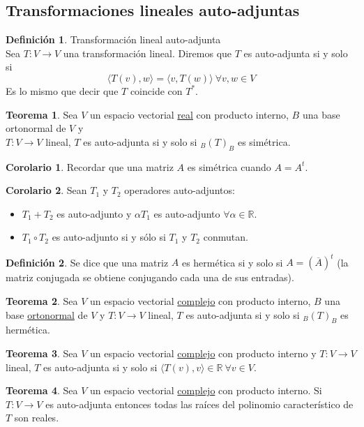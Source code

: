 \documentclass[10pt]{article}
\theoremstyle{definition}
\newtheorem{definition}{Definición}[section]
\newtheorem{theorem}{Teorema}[section]
\newtheorem{corollary}{Corolario}[theorem]
\begin{document}
\subsection{Transformaciones lineales auto-adjuntas}
\begin{definition}{Transformación lineal auto-adjunta}
	\\Sea $T:V\to V$ una transformación lineal. Diremos que $T$ es auto-adjunta si y solo si $$\langle T(v),w\rangle=\langle v,T(w)\rangle\ \forall v,w\in V$$
	Es lo mismo que decir que $T$ coincide con $T^*$.
\end{definition}
\begin{theorem}
	Sea $V$ un espacio vectorial \underline{real} con producto interno, $B$ una base ortonormal de $V$ y\\ $T:V\to V$ lineal, $T$ es auto-adjunta si y solo si $_B(T)_B$ es simétrica.
\end{theorem}
\begin{corollary}
	Recordar que una matriz $A$ es simétrica cuando $A=A^t$.
\end{corollary}
\begin{corollary}
    Sean $T_1$ y $T_2$ operadores auto-adjuntos:
    \begin{itemize}
        \item $T_1+T_2$ es auto-adjunto y $\alpha T_1$ es auto-adjunto $\forall\alpha\in\mathbb{R}$.
        \item $T_1\circ T_2$ es auto-adjunto si y sólo si $T_1$ y $T_2$ conmutan.
    \end{itemize}
\end{corollary}
\begin{definition}
	Se dice que una matriz $A$ es hermética si y solo si $A=(\overline{A})^t$ (la matriz conjugada se obtiene conjugando cada una de sus entradas).
\end{definition}
\begin{theorem}
	Sea $V$ un espacio vectorial \underline{complejo} con producto interno, $B$ una base \underline{ortonormal} de $V$ y $T:V\to V$ lineal, $T$ es auto-adjunta si y solo si $_B(T)_B$ es hermética.
\end{theorem}
\begin{theorem}
	Sea $V$ un espacio vectorial \underline{complejo} con producto interno y $T:V\to V$ lineal, $T$ es auto-adjunta si y solo si $\langle T(v),v\rangle\in\mathbb{R}\ \forall v\in V$.
\end{theorem}
\begin{theorem}
	Sea $V$ un espacio vectorial \underline{complejo} con producto interno. Si $T:V\to V$ es auto-adjunta entonces todas las raíces del polinomio característico de $T$ son reales.
\end{theorem}
\end{document}
